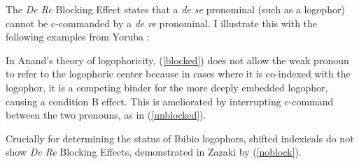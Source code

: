 \documentclass[output=paper]{langscibook}
\begin{document}
The \textit{De Re} Blocking Effect \citep{Anand2006} states that a \textit{de se} pronominal (such as a logophor) cannot be c-commanded by a \textit{de re} pronominal. I illustrate this with the following examples from Yoruba \citep{Adesola2005}:
\begin{exe}
	\label{control}
	\label{blocked}
	\label{unblocked}
\end{exe}
In Anand's theory of logophoricity, (\ref{blocked}) does not allow the weak pronoun to refer to the logophoric center because in cases where it is co-indexed with the logophor, it is a competing binder for the more deeply embedded logophor, causing a condition B effect. This is ameliorated by interrupting c-command between the two pronouns, as in (\ref{unblocked}).

Crucially for determining the status of Ibibio logophors, shifted indexicals do not show \textit{De Re} Blocking Effects, demonstrated in Zazaki by (\ref{noblock}).
\end{document}
